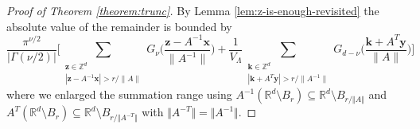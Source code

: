 \documentclass[]{amsart}
\numberwithin{mythm}{section}
\begin{document}
\begin{proof}[Proof of Theorem \ref{theorem:trunc}]
By 
Lemma \ref{lem:z-is-enough-revisited} the absolute value of the remainder is bounded by
$$
    \frac{\pi^{\nu/2}}{|\Gamma(\nu/2)|}\Bigg[\sum_{\substack{\bm z\in\mathds Z^d\\ |\bm z - A^{-1}\bm x|> r/\|A\|}}\!\!
    G_{\nu}\Big(\frac{\bm{z} -A^{-1}\bm x}{\|A^{-1}\|}\Big)
+\frac{1}{V_{\Lambda}}
\!\!\!
\sum_{\substack{\bm k\in\mathds Z^d\\ |\bm k + A^T\bm y|> r/\|A^{-1}\|}}
\!\!\!\!\!
G_{d-\nu}
\Big(\frac{\bm{k} + A^T\bm y}{\|A\|}\Big) 
\Bigg]
$$
where we enlarged the summation range using $A^{-1}(\mathds R^d\setminus B_r)\subseteq \mathds R^d\setminus B_{r/\Vert A\Vert}$ and
$A^{T}(\mathds R^d\setminus B_r)\subseteq \mathds R^d\setminus B_{r/\Vert A^{-T}\Vert}$ with $\Vert A^{-T}\Vert=\Vert A^{-1}\Vert$.



\end{proof}
\end{document}
